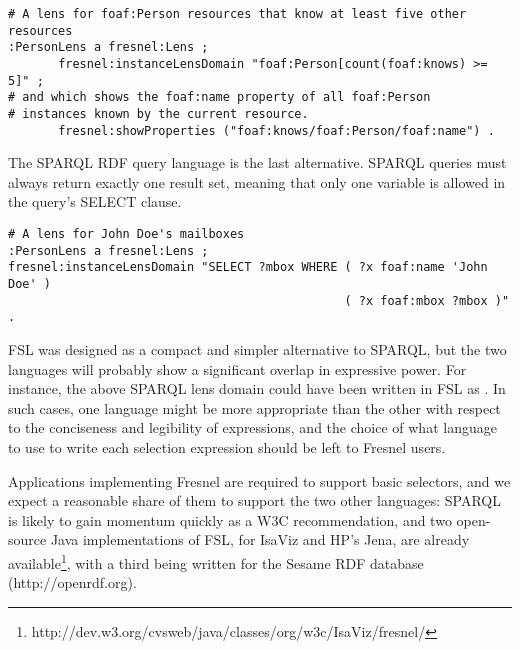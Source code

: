 \begin{small}
\begin{verbatim}
# A lens for foaf:Person resources that know at least five other resources
:PersonLens a fresnel:Lens ;
       fresnel:instanceLensDomain "foaf:Person[count(foaf:knows) >= 5]" ;
# and which shows the foaf:name property of all foaf:Person
# instances known by the current resource.
       fresnel:showProperties ("foaf:knows/foaf:Person/foaf:name") .
\end{verbatim}
\end{small}

The SPARQL RDF query language \cite{sparql05} is the last alternative. SPARQL queries must always return exactly one result set, meaning that only one variable is allowed in the query's SELECT clause.

\begin{small}
\begin{verbatim}
# A lens for John Doe's mailboxes
:PersonLens a fresnel:Lens ;
fresnel:instanceLensDomain "SELECT ?mbox WHERE ( ?x foaf:name 'John Doe' )
                                               ( ?x foaf:mbox ?mbox )" .
\end{verbatim}
\end{small}

FSL was designed as a compact and simpler alternative to SPARQL, but the two languages will probably show a significant overlap in expressive power. For instance, the above SPARQL lens domain could have been written in FSL as . In such cases, one language might be more appropriate than the other with respect to the conciseness and legibility of expressions, and the choice of what language to use to write each selection expression should be left to Fresnel users. 

Applications implementing Fresnel are required to support basic selectors, and we expect a reasonable share of them to support the two other languages: SPARQL is likely to gain momentum quickly as a W3C recommendation, and two open-source Java implementations of FSL, for IsaViz and HP's Jena, are already available\footnote{http://dev.w3.org/cvsweb/java/classes/org/w3c/IsaViz/fresnel/}, with a third being written for the Sesame RDF database (http://openrdf.org).











